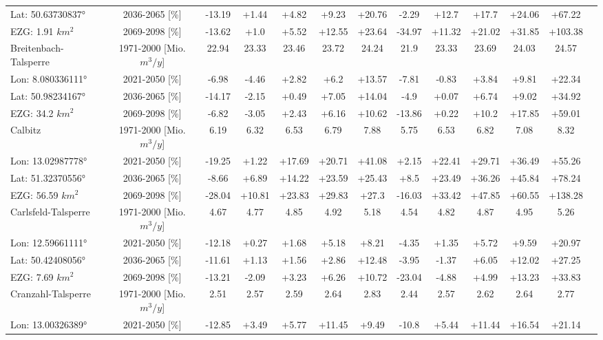 \begin{longtable}{@{\extracolsep{\fill}}lc|ccccc||cccccc}
Lat: 50.63730837° & 2036-2065 [\%]  & -13.19 & +1.44 & +4.82 & +9.23 & +20.76 & -2.29 & +12.7 & +17.7 & +24.06 & +67.22 & \\ 
EZG: 1.91 $km^2$ & 2069-2098 [\%]  & -13.62 & +1.0 & +5.52 & +12.55 & +23.64 & -34.97 & +11.32 & +21.02 & +31.85 & +103.38 & \\ 
\hline 
Breitenbach-Talsperre & 1971-2000 [Mio. $m^3/y$]  & 22.94 & 23.33 & 23.46 & 23.72 & 24.24 & 21.9 & 23.33 & 23.69 & 24.03 & 24.57 & \\ 
\cline{2-13} 
Lon: 8.080336111° & 2021-2050 [\%]  & -6.98 & -4.46 & +2.82 & +6.2 & +13.57 & -7.81 & -0.83 & +3.84 & +9.81 & +22.34 & \\ 
Lat: 50.98234167° & 2036-2065 [\%]  & -14.17 & -2.15 & +0.49 & +7.05 & +14.04 & -4.9 & +0.07 & +6.74 & +9.02 & +34.92 & \\ 
EZG: 34.2 $km^2$ & 2069-2098 [\%]  & -6.82 & -3.05 & +2.43 & +6.16 & +10.62 & -13.86 & +0.22 & +10.2 & +17.85 & +59.01 & \\ 
\hline 
Calbitz & 1971-2000 [Mio. $m^3/y$]  & 6.19 & 6.32 & 6.53 & 6.79 & 7.88 & 5.75 & 6.53 & 6.82 & 7.08 & 8.32 & \\ 
\cline{2-13} 
Lon: 13.02987778° & 2021-2050 [\%]  & -19.25 & +1.22 & +17.69 & +20.71 & +41.08 & +2.15 & +22.41 & +29.71 & +36.49 & +55.26 & \\ 
Lat: 51.32370556° & 2036-2065 [\%]  & -8.66 & +6.89 & +14.22 & +23.59 & +25.43 & +8.5 & +23.49 & +36.26 & +45.84 & +78.24 & \\ 
EZG: 56.59 $km^2$ & 2069-2098 [\%]  & -28.04 & +10.81 & +23.83 & +29.83 & +27.3 & -16.03 & +33.42 & +47.85 & +60.55 & +138.28 & \\ 
\hline 
Carlsfeld-Talsperre & 1971-2000 [Mio. $m^3/y$]  & 4.67 & 4.77 & 4.85 & 4.92 & 5.18 & 4.54 & 4.82 & 4.87 & 4.95 & 5.26 & \\ 
\cline{2-13} 
Lon: 12.59661111° & 2021-2050 [\%]  & -12.18 & +0.27 & +1.68 & +5.18 & +8.21 & -4.35 & +1.35 & +5.72 & +9.59 & +20.97 & \\ 
Lat: 50.42408056° & 2036-2065 [\%]  & -11.61 & +1.13 & +1.56 & +2.86 & +12.48 & -3.95 & -1.37 & +6.05 & +12.02 & +27.25 & \\ 
EZG: 7.69 $km^2$ & 2069-2098 [\%]  & -13.21 & -2.09 & +3.23 & +6.26 & +10.72 & -23.04 & -4.88 & +4.99 & +13.23 & +33.83 & \\ 
\hline 
Cranzahl-Talsperre & 1971-2000 [Mio. $m^3/y$]  & 2.51 & 2.57 & 2.59 & 2.64 & 2.83 & 2.44 & 2.57 & 2.62 & 2.64 & 2.77 & \\ 
\cline{2-13} 
Lon: 13.00326389° & 2021-2050 [\%]  & -12.85 & +3.49 & +5.77 & +11.45 & +9.49 & -10.8 & +5.44 & +11.44 & +16.54 & +21.14 & \\ 

\end{longtable}
